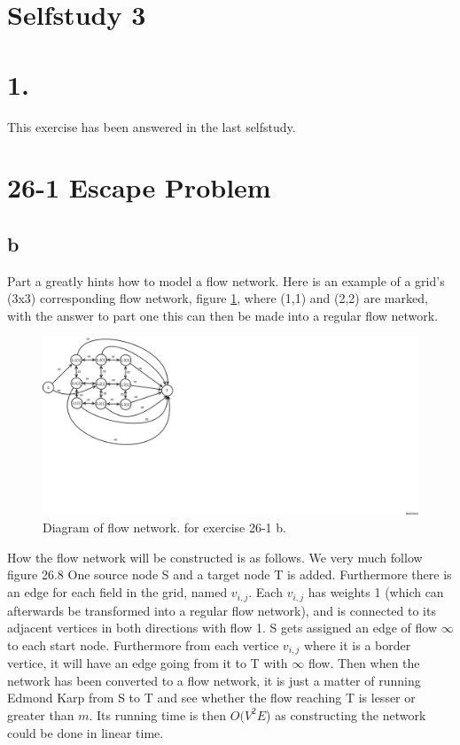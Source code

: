 \documentclass[12pt,a4paper]{report}
\begin{document}
\section*{Selfstudy 3}
\section*{1.}
This exercise has been answered in the last selfstudy.
\section*{26-1 Escape Problem}
\subsection*{b}
Part a greatly hints how to model a flow network.
Here is an example of a grid's (3x3) corresponding flow network, figure \ref{diagram}, where (1,1) and (2,2) are marked, with the answer to part one this can then be made into a regular flow network.

\begin{figure}
     \centering
     \includegraphics[scale=0.5]{diagram}
     \caption{Diagram of flow network. for exercise 26-1 b.}     
     \label{diagram}
     
\end{figure}

How the flow network will be constructed is as follows.
We very much follow figure 26.8
One source node S and a target node T is added.
Furthermore there is an edge for each field in the grid, named $v_{i,j}$. 
Each $v_{i,j}$ has weights 1 (which can afterwards be transformed into a regular flow network), and is connected to its adjacent vertices in both directions with flow 1.
S gets assigned an edge of flow $\infty$ to each start node.
Furthermore from each vertice $v_{i,j}$ where it is a border vertice, it will have an edge going from it to T with $\infty$ flow.
Then when the network has been converted to a flow network, it is just a matter of running Edmond Karp from S to T and see whether the flow reaching T is lesser or greater than $m$.
Its running time is then $O(V^2E$) as constructing the network could be done in linear time.
\end{document}
